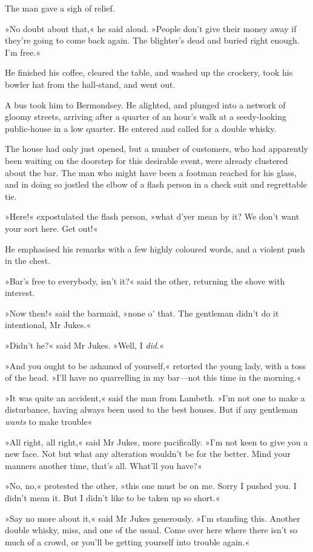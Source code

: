 The man gave a sigh of relief.

»No doubt about that,« he said aloud. »People don't give their money away if they're going to come back again. The blighter's dead and buried right enough. I'm free.«

He finished his coffee, cleared the table, and washed up the crockery, took his bowler hat from the hall-stand, and went out.

A bus took him to Bermondsey. He alighted, and plunged into a network of gloomy streets, arriving after a quarter of an hour's walk at a seedy-looking public-house in a low quarter. He entered and called for a double whisky.

The house had only just opened, but a number of customers, who had apparently been waiting on the doorstep for this desirable event, were already clustered about the bar. The man who might have been a footman reached for his glass, and in doing so jostled the elbow of a flash person in a check suit and regrettable tie.

»Here!« expostulated the flash person, »what d'yer mean by it? We don't want your sort here. Get out!«

He emphasised his remarks with a few highly coloured words, and a violent push in the chest.

»Bar's free to everybody, isn't it?« said the other, returning the shove with interest.

»Now then!« said the barmaid, »none o' that. The gentleman didn't do it intentional, Mr Jukes.«

»Didn't he?« said Mr Jukes. »Well, I \textit{did}.«

»And you ought to be ashamed of yourself,« retorted the young lady, with a toss of the head. »I'll have no quarrelling in my bar—not this time in the morning.«

»It was quite an accident,« said the man from Lambeth. »I'm not one to make a disturbance, having always been used to the best houses. But if any gentleman \textit{wants} to make trouble\longdash«

»All right, all right,« said Mr Jukes, more pacifically. »I'm not keen to give you a new face. Not but what any alteration wouldn't be for the better. Mind your manners another time, that's all. What'll you have?«

»No, no,« protested the other, »this one must be on me. Sorry I pushed you. I didn't mean it. But I didn't like to be taken up so short.«

»Say no more about it,« said Mr Jukes generously. »I'm standing this. Another double whisky, miss, and one of the usual. Come over here where there isn't so much of a crowd, or you'll be getting yourself into trouble again.«

